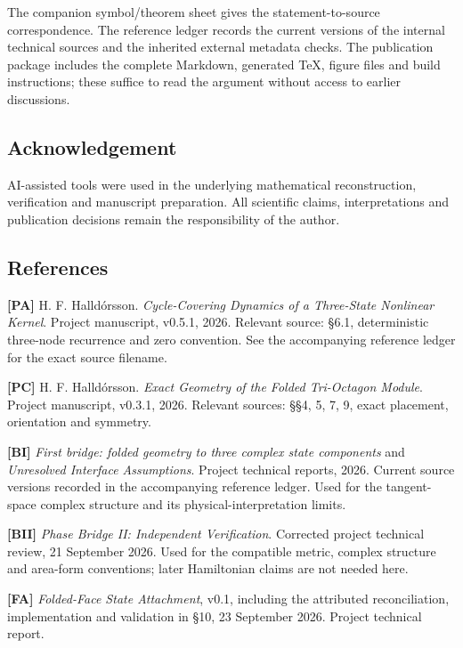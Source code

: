 \documentclass[
  11pt,
  a4paper,
]{article}
\begin{document}
The companion symbol/theorem sheet gives the statement-to-source correspondence. The reference ledger records the current versions of the internal technical sources and the inherited external metadata checks. The publication package includes the complete Markdown, generated TeX, figure files and build instructions; these suffice to read the argument without access to earlier discussions.

\subsection{Acknowledgement}\label{acknowledgement}

AI-assisted tools were used in the underlying mathematical reconstruction, verification and manuscript preparation. All scientific claims, interpretations and publication decisions remain the responsibility of the author.

\clearpage

\subsection{References}\label{references}

\textbf{{[}PA{]}} H. F. Halldórsson. \emph{Cycle-Covering Dynamics of a Three-State Nonlinear Kernel}. Project manuscript, v0.5.1, 2026. Relevant source: §6.1, deterministic three-node recurrence and zero convention. See the accompanying reference ledger for the exact source filename.

\textbf{{[}PC{]}} H. F. Halldórsson. \emph{Exact Geometry of the Folded Tri-Octagon Module}. Project manuscript, v0.3.1, 2026. Relevant sources: §§4, 5, 7, 9, exact placement, orientation and symmetry.

\textbf{{[}BI{]}} \emph{First bridge: folded geometry to three complex state components} and \emph{Unresolved Interface Assumptions}. Project technical reports, 2026. Current source versions recorded in the accompanying reference ledger. Used for the tangent-space complex structure and its physical-interpretation limits.

\textbf{{[}BII{]}} \emph{Phase Bridge II: Independent Verification}. Corrected project technical review, 21 September 2026. Used for the compatible metric, complex structure and area-form conventions; later Hamiltonian claims are not needed here.

\textbf{{[}FA{]}} \emph{Folded-Face State Attachment}, v0.1, including the attributed reconciliation, implementation and validation in §10, 23 September 2026. Project technical report.
\end{document}
